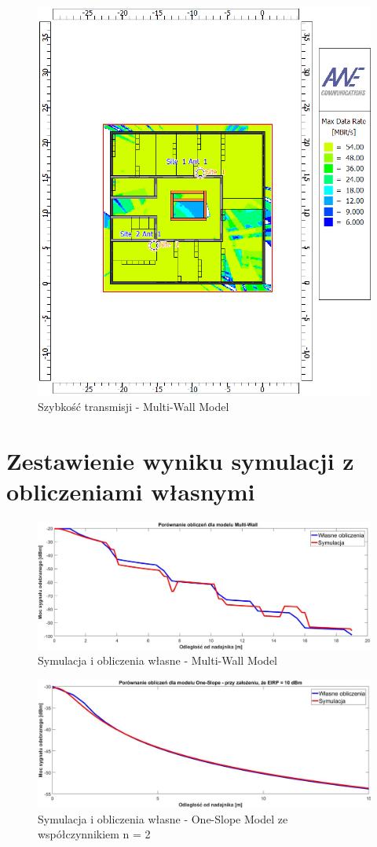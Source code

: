 \documentclass[12pt, a4paper, oneside]{article}
\begin{document}
\begin{figure}[h]
\centering
\caption{Szybkość transmisji - Multi-Wall Model}
\includegraphics[scale=0.65]{RATE.png}
\end{figure}
\clearpage
\section{Zestawienie wyniku symulacji z obliczeniami własnymi}
\begin{figure}[h]
\centering
\caption{Symulacja i obliczenia własne - Multi-Wall Model}
\includegraphics[scale=0.4]{comparation.png}
\end{figure}
\begin{figure}[h]
\centering
\caption{Symulacja i obliczenia własne - One-Slope Model ze współczynnikiem n = 2}
\includegraphics[scale=0.3]{comparation2.png}
\end{figure}
\clearpage
\end{document}
